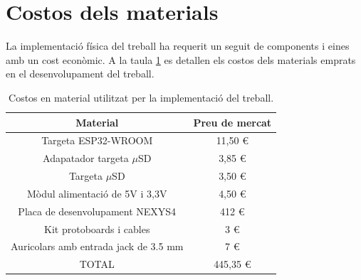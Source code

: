 \section{Costos dels materials}
\par La implementació física del treball ha requerit un seguit de components i eines amb un cost econòmic. A la taula \ref{taula_material} es detallen els costos dels materials emprats en el desenvolupament del treball. 
\begin{table}
    \centering
    \begin{tabular}{ | c | c | }
    \hline
    \centering
    \textbf{Material}     &  \textbf{Preu de mercat}\\ [2ex] \hline
    \centering
    Targeta ESP32-WROOM    &    11,50 \euro \\ \hline
    \centering
    Adapatador targeta $\mu$SD    &    3,85 \euro \\ \hline
    \centering
    Targeta $\mu$SD    &    3,50 \euro \\ \hline
    \centering
    Mòdul alimentació de 5V i 3,3V    &    4,50 \euro \\ \hline
    \centering
    Placa de desenvolupament NEXYS4    &    412 \euro \\ \hline
    \centering
    Kit protoboards i cables    &    3 \euro \\ \hline
    \centering
    Auricolars amb entrada jack de 3.5 mm    &    7 \euro \\ \hline
    \centering
    \textsc{TOTAL}    &    445,35 \euro \\ \hline
    \end{tabular}
    \caption{Costos en material utilitzat per la implementació del treball.}
    \label{taula_material}
\end{table}


